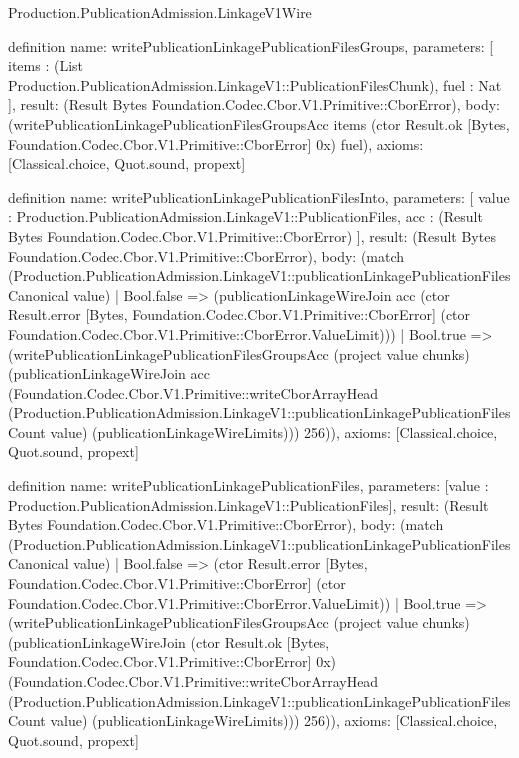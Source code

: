 \begin{lexlean}{Production.PublicationAdmission.LinkageV1Wire}
\begin{semanticmodule}
definition{
  name: writePublicationLinkagePublicationFilesGroups,
  parameters: [
    items : (List Production.PublicationAdmission.LinkageV1::PublicationFilesChunk),
    fuel : Nat
  ],
  result: (Result Bytes Foundation.Codec.Cbor.V1.Primitive::CborError),
  body: (writePublicationLinkagePublicationFilesGroupsAcc items (ctor Result.ok [Bytes, Foundation.Codec.Cbor.V1.Primitive::CborError] 0x) fuel),
  axioms: [Classical.choice, Quot.sound, propext]
}

definition{
  name: writePublicationLinkagePublicationFilesInto,
  parameters: [
    value : Production.PublicationAdmission.LinkageV1::PublicationFiles,
    acc : (Result Bytes Foundation.Codec.Cbor.V1.Primitive::CborError)
  ],
  result: (Result Bytes Foundation.Codec.Cbor.V1.Primitive::CborError),
  body: (match (Production.PublicationAdmission.LinkageV1::publicationLinkagePublicationFilesCanonical value)
    | Bool.false => (publicationLinkageWireJoin acc (ctor Result.error [Bytes, Foundation.Codec.Cbor.V1.Primitive::CborError] (ctor Foundation.Codec.Cbor.V1.Primitive::CborError.ValueLimit)))
    | Bool.true => (writePublicationLinkagePublicationFilesGroupsAcc (project value chunks) (publicationLinkageWireJoin acc (Foundation.Codec.Cbor.V1.Primitive::writeCborArrayHead (Production.PublicationAdmission.LinkageV1::publicationLinkagePublicationFilesCount value) (publicationLinkageWireLimits))) 256)),
  axioms: [Classical.choice, Quot.sound, propext]
}

definition{
  name: writePublicationLinkagePublicationFiles,
  parameters: [value : Production.PublicationAdmission.LinkageV1::PublicationFiles],
  result: (Result Bytes Foundation.Codec.Cbor.V1.Primitive::CborError),
  body: (match (Production.PublicationAdmission.LinkageV1::publicationLinkagePublicationFilesCanonical value)
    | Bool.false => (ctor Result.error [Bytes, Foundation.Codec.Cbor.V1.Primitive::CborError] (ctor Foundation.Codec.Cbor.V1.Primitive::CborError.ValueLimit))
    | Bool.true => (writePublicationLinkagePublicationFilesGroupsAcc (project value chunks) (publicationLinkageWireJoin (ctor Result.ok [Bytes, Foundation.Codec.Cbor.V1.Primitive::CborError] 0x) (Foundation.Codec.Cbor.V1.Primitive::writeCborArrayHead (Production.PublicationAdmission.LinkageV1::publicationLinkagePublicationFilesCount value) (publicationLinkageWireLimits))) 256)),
  axioms: [Classical.choice, Quot.sound, propext]
}


\end{semanticmodule}
\end{lexlean}
